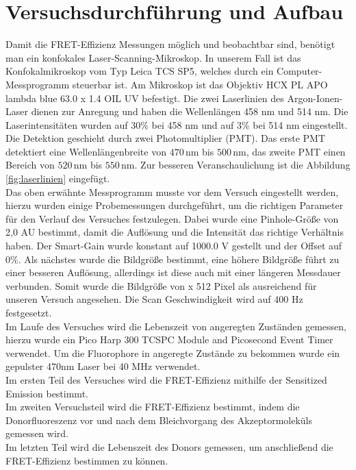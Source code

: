 \chapter{Versuchsdurchführung und Aufbau}
Damit die FRET-Effizienz Messungen möglich und beobachtbar sind, benötigt man ein konfokales Laser-Scanning-Mikroskop.
In unserem Fall ist das Konfokalmikroskop vom Typ Leica TCS SP5, welches durch ein Computer-Messprogramm steuerbar ist. Am Mikroskop ist das Objektiv 
HCX PL APO lambda blue 63.0 x 1.4 OIL UV befestigt. 
Die zwei Laserlinien des Argon-Ionen-Laser 
dienen zur Anregung und haben die Wellenlängen 458 nm und 514 nm. Die Laserintensitäten 
wurden auf 30\% bei 458 nm und auf 3\% bei 514 nm eingestellt.
Die Detektion geschieht durch zwei Photomultiplier (PMT). Das erste PMT detektiert 
eine Wellenlängenbreite von $470\,$nm bis $500\,$nm, das zweite PMT einen Bereich von $520\,$nm bis $550\,$nm.
Zur besseren Veranschaulichung ist die Abbildung \ref{fig:laserlinien} eingefügt.\\
Das oben erwähnte Messprogramm musste vor dem Versuch eingestellt werden, hierzu 
wurden einige Probemessungen durchgeführt, um die richtigen Parameter für den Verlauf des Versuches
festzulegen. 
Dabei wurde eine Pinhole-Größe von 2,0 AU bestimmt, damit die Auflösung und die Intensität das
richtige Verhältnis haben.
Der Smart-Gain wurde konstant 
auf 1000.0 V gestellt und der Offset auf 0\%. 
Als nächstes wurde die Bildgröße bestimmt, eine höhere Bildgröße
führt zu einer besseren Auflösung, allerdings ist diese auch mit einer 
längeren Messdauer verbunden.  Somit wurde die Bildgröße von  x 512 Pixel als ausreichend für unseren
Versuch angesehen. 
Die Scan Geschwindigkeit wird auf 400 Hz festgesetzt. \\
Im Laufe des Versuches wird die Lebenszeit von angeregten Zuständen gemessen, 
hierzu wurde ein Pico Harp 300 TCSPC Module and Picosecond Event Timer verwendet. Um die Fluorophore 
in angeregte Zustände zu bekommen wurde ein gepulster 470nm Laser bei 40 MHz verwendet. \\
Im ersten Teil des Versuches wird die FRET-Effizienz mithilfe der Sensitized Emission bestimmt.\\
Im zweiten Versuchsteil wird die FRET-Effizienz bestimmt, indem die Donorfluoreszenz vor
und nach dem Bleichvorgang des Akzeptormoleküls gemessen wird. \\
Im letzten Teil wird die Lebenszeit des Donors gemessen, um anschließend die FRET-Effizienz
bestimmen zu können.
